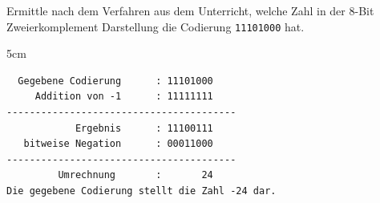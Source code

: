 \question[3]
Ermittle nach dem Verfahren aus dem Unterricht, welche Zahl in der 8-Bit Zweierkomplement
Darstellung die Codierung \texttt{11101000} hat.

\begin{solutionbox}{5cm}
\begin{lstlisting}
  Gegebene Codierung      : 11101000
     Addition von -1      : 11111111
----------------------------------------
            Ergebnis      : 11100111
   bitweise Negation      : 00011000
----------------------------------------
         Umrechnung       :       24
Die gegebene Codierung stellt die Zahl -24 dar.
\end{lstlisting}
\end{solutionbox}
